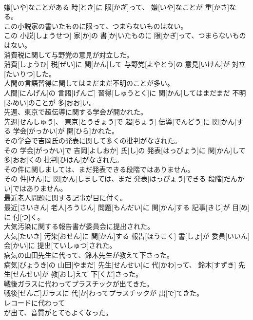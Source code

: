 \documentclass[8pt]{extreport}
\begin{document}
\begin{CJK}{UTF8}{min}
\\	嫌[いや]なことがある 時[とき]に 限[かぎ]って、 嫌[いや]なことが 重[かさ]なる。
\\	この小説家の書いたものに限って、つまらないものはない。	
\\	この 小説[しょうせつ] 家[か]の 書[か]いたものに 限[かぎ]って、つまらないものはない。
\\	消費税に関して与野党の意見が対立した。	
\\	消費[しょうひ] 税[ぜい]に 関[かん]して 与野党[よやとう]の 意見[いけん]が 対立[たいりつ]した。
\\	人間の言語習得に関してはまだまだ不明のことが多い。	
\\	人間[にんげん]の 言語[げんご] 習得[しゅうとく]に 関[かん]してはまだまだ 不明[ふめい]のことが 多[おお]い。
\\	先週、東京で超伝導に関する学会が開かれた。	
\\	先週[せんしゅう]、 東京[とうきょう]で 超[ちょう] 伝導[でんどう]に 関[かん]する 学会[がっかい]が 開[ひら]かれた。
\\	その学会で吉岡氏の発表に関して多くの批判がなされた。	
\\	その 学会[がっかい]で 吉岡[よしおか] 氏[し]の 発表[はっぴょう]に 関[かん]して 多[おお]くの 批判[ひはん]がなされた。
\\	その件に関しましては、まだ発表できる段階ではありません。	
\\	その 件[けん]に 関[かん]しましては、まだ 発表[はっぴょう]できる 段階[だんかい]ではありません。
\\	最近老人問題に関する記事が目に付く。	
\\	最近[さいきん] 老人[ろうじん] 問題[もんだい]に 関[かん]する 記事[きじ]が 目[め]に 付[つ]く。
\\	大気汚染に関する報告書が委員会に提出された。	
\\	大気[たいき] 汚染[おせん]に 関[かん]する 報告[ほうこく] 書[しょ]が 委員[いいん] 会[かい]に 提出[ていしゅつ]された。
\\	病気の山田先生に代って、鈴木先生が教えて下さった。	
\\	病気[びょうき]の 山田[やまだ] 先生[せんせい]に 代[かわ]って、 鈴木[すずき] 先生[せんせい]が 教[おし]えて 下[くだ]さった。
\\	戦後ガラスに代わってプラスチックが出てきた。	
\\	戦後[せんご]ガラスに 代[か]わってプラスチックが 出[で]てきた。
\\	レコードに代わって
\\	が出て、音質がとてもよくなった。	

\end{CJK}
\end{document}
